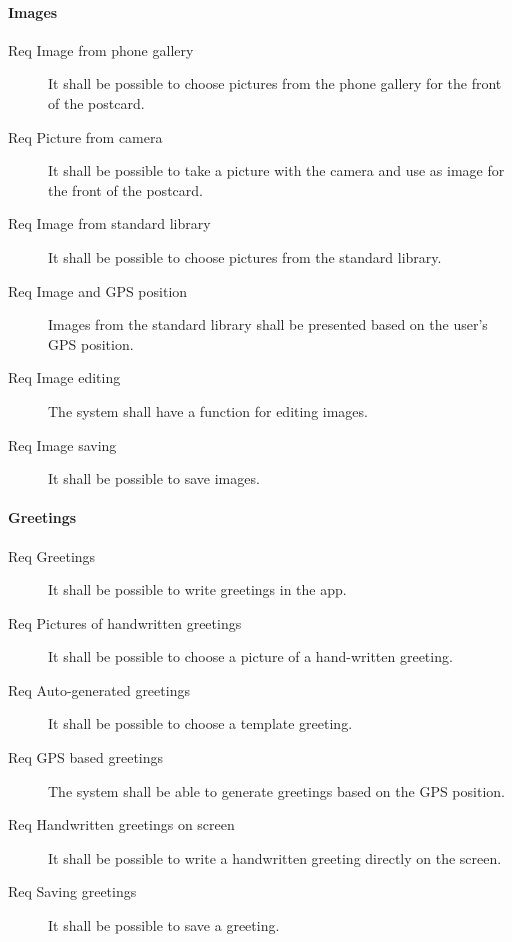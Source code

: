 \documentclass[10pt,a4paper]{article}
\begin{document}
\paragraph{Images} 
\begin {description}
\item [Req  Image from phone gallery]It shall be possible to choose pictures from the phone gallery for the front of the postcard.
\item [Req  Picture from camera] It shall be possible to take a picture with the camera and use as image for the front of the postcard.
\item [Req  Image from standard library] It shall be possible to choose pictures from the standard library.
\item [Req  Image and GPS position] Images from the standard library shall be presented based on the user's GPS position.
\item [Req  Image editing] The system shall have a function for editing images.
\item [Req  Image saving] It shall be possible to save images.
\end{description}

\paragraph{Greetings}
\begin{description}
	\item [Req  Greetings] It shall be possible to write greetings in the app.
	\item [Req  Pictures of handwritten greetings] It shall be possible to choose a picture of a hand-written greeting.
	\item [Req  Auto-generated greetings] It shall be possible to choose a template greeting.
	\item [Req  GPS based greetings] The system shall be able to generate greetings based on the GPS position.
	\item [Req  Handwritten greetings on screen] It shall be possible to write a handwritten greeting directly on the screen.
	\item [Req  Saving greetings] It shall be possible to save a greeting.
\end{description}
\end{document}
